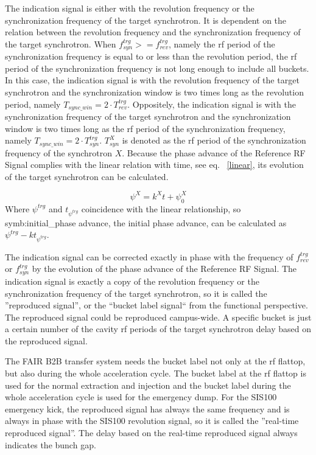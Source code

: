 The indication signal is either with the revolution frequency or the synchronization frequency of the target synchrotron. It is dependent on the relation between the revolution frequency and the synchronization frequency of the target synchrotron.  When $f_{\mathit{syn}}^{trg}>=f_{\mathit{rev}}^{trg}$, namely the rf period of the synchronization frequency is equal to or less than the revolution period, the  rf period of the synchronization frequency is not long enough to include all buckets. In this case, the indication signal is with the revolution frequency of the target synchrotron and the synchronization window is two times long as the revolution period, namely $T_{\mathit{sync\_win}}=2\cdot T_{\mathit{rev}}^{\mathit{trg}}$. Oppositely, the indication signal is with the synchronization frequency of the target synchrotron and the synchronization window is two times long as the rf period of the synchronization frequency, namely $T_{\mathit{sync\_win}}=2\cdot T_\mathit{syn}^{\mathit{trg}}$. $T_\mathit{syn}^X$ is denoted as the rf period of the synchronization frequency of the synchrotron $X$. Because the phase advance of the Reference RF Signal complies with the linear relation with time, see eq. ~\ref{linear}, its evolution of the target synchrotron can be calculated.  

\begin{equation}
\psi^X= k^Xt+\psi_0^X \label{linear}
\end{equation}
Where $\psi^\mathit{trg}$ and $t_{\psi^\mathit{trg}}$ coincidence with the linear relationship, so \gls{symb:initial_phase advance}, the initial phase advance, can be calculated as $\psi^\mathit{trg}-kt_{\psi^\mathit{trg}}$.


The indication signal can be corrected exactly in phase with the frequency of $f_{\mathit{rev}}^{trg}$ or $f_{\mathit{syn}}^{trg}$ by the evolution of the phase advance of the Reference RF Signal. The indication signal is exactly a copy of the revolution frequency or the synchronization frequency of the target synchrotron, so it is called the ''reproduced signal'', or the ``bucket label signal`` from the functional perspective. The reproduced signal could be reproduced campus-wide. A specific bucket is just a certain number of the cavity rf periods of the target synchrotron delay based on the reproduced signal.


The FAIR B2B transfer system needs the bucket label not only at the rf flattop, but also during the whole acceleration cycle. The bucket label at the rf flattop is used for the normal extraction and injection and the bucket label during the whole acceleration cycle is used for the emergency dump. For the SIS100 emergency kick, the reproduced signal has always the same frequency and is always in phase with the SIS100 revolution signal, so it is called the ''real-time reproduced signal''. The delay based on the real-time reproduced signal always indicates the bunch gap.



